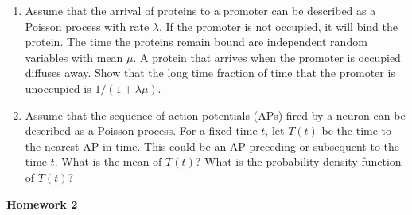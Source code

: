 \documentclass[12pt]{article}
\begin{document}
\begin{enumerate}
\item Assume that the arrival of proteins to a promoter can be described as a Poisson process with 
rate $\lambda$.  If the promoter is not occupied, it will bind the protein. The time the proteins remain bound
are independent random variables with mean $\mu$. A protein that arrives when the promoter is 
occupied diffuses away.  Show that the long time fraction of time that the promoter is unoccupied is 
$1/(1 + \lambda \mu)$.

\item Assume that the sequence of action potentials (APs) fired by a neuron can be described as a Poisson process.
For a fixed time $t$, let $T(t)$ be the time to the nearest AP in time.  This could be an AP
preceding or subsequent to the time $t$.   What is the mean of $T(t)$?  What is the probability density function of $T(t)$?

\end{enumerate}


\clearpage

\begin{center}
{\Large \bf Homework 2
\\ \vskip5mm }
\end{center}

\vskip5mm 
\end{document}
